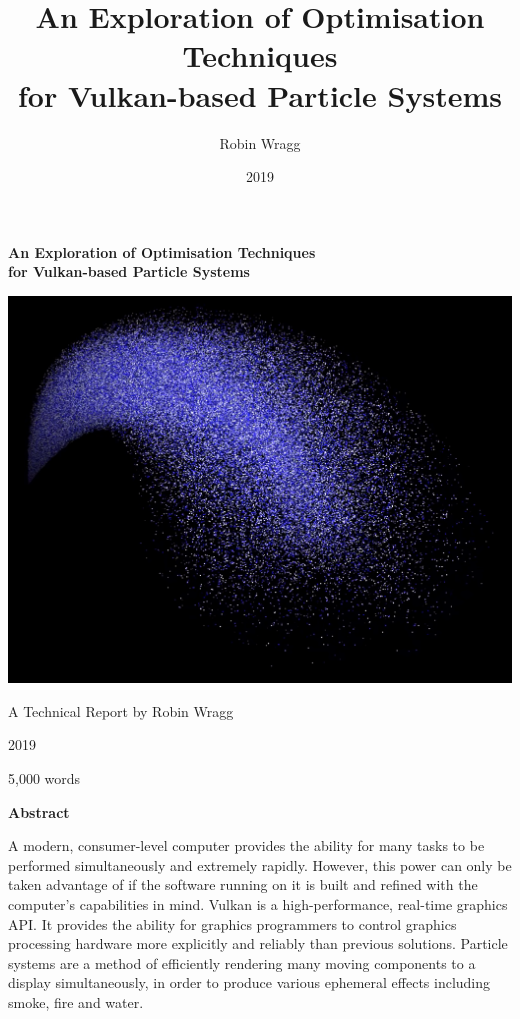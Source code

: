 \documentclass[11pt, a4paper, twocolumn]{article}
\begin{document}
\onecolumn

\title{\sffamily\bfseries An Exploration of Optimisation Techniques\\for Vulkan-based Particle Systems}
\author{Robin Wragg}
\date{2019}

\begin{center}

\vspace*{1cm}

{\sffamily\bfseries\huge An Exploration of Optimisation Techniques\\for Vulkan-based Particle Systems}

\vspace{1cm}

\includegraphics[width=14cm]{particles}

\vspace{1cm}

{\Large A Technical Report by Robin Wragg}

\vspace{0.4cm}

{\Large 2019}

\vspace{0.4cm}

{\Large 5,000 words}

\vspace{1cm}

{\sffamily\bfseries\LARGE Abstract}
\end{center}

A modern, consumer-level computer provides the ability for many tasks to be performed simultaneously and extremely rapidly. However, this power can only be taken advantage of if the software running on it is built and refined with the computer's capabilities in mind. Vulkan is a high-performance, real-time graphics API. It provides the ability for graphics programmers to control graphics processing hardware more explicitly and reliably than previous solutions. Particle systems are a method of efficiently rendering many moving components to a display simultaneously, in order to produce various ephemeral effects including smoke, fire and water.
\end{document}
